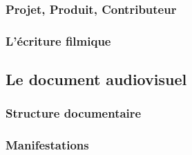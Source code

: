 \subsubsection{Projet, Produit, Contributeur}\label{}
\subsubsection{L'écriture filmique}\label{}


\subsection{Le document audiovisuel}\label{}
\subsubsection{Structure documentaire}\label{}
\subsubsection{Manifestations}




